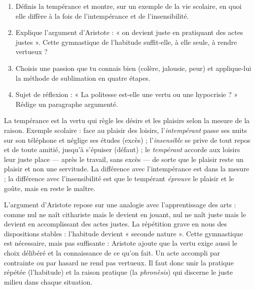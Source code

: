 \documentclass[11pt]{article}
\begin{document}
\begin{exercice}
\begin{enumerate}
\item Définis la tempérance et montre, sur un exemple de la vie scolaire, en quoi elle diffère à la fois de l'intempérance et de l'insensibilité.
\item Explique l'argument d'Aristote : « on devient juste en pratiquant des actes justes ». Cette gymnastique de l'habitude suffit-elle, à elle seule, à rendre vertueux ?
\item Choisis une passion que tu connais bien (colère, jalousie, peur) et applique-lui la méthode de sublimation en quatre étapes.
\item Sujet de réflexion : « La politesse est-elle une vertu ou une hypocrisie ? » Rédige un paragraphe argumenté.
\end{enumerate}
\end{exercice}

\begin{corrige}[Exercice 1]
La tempérance est la vertu qui règle les désirs et les plaisirs selon la mesure de la raison. Exemple scolaire : face au plaisir des loisirs, l'\emph{intempérant} passe ses nuits sur son téléphone et néglige ses études (excès) ; l'\emph{insensible} se prive de tout repos et de toute amitié, jusqu'à s'épuiser (défaut) ; le \emph{tempérant} accorde aux loisirs leur juste place — après le travail, sans excès — de sorte que le plaisir reste un plaisir et non une servitude. La différence avec l'intempérance est dans la mesure ; la différence avec l'insensibilité est que le tempérant \emph{éprouve} le plaisir et le goûte, mais en reste le maître.
\end{corrige}

\begin{corrige}[Exercice 2]
L'argument d'Aristote repose sur une analogie avec l'apprentissage des arts : comme nul ne naît cithariste mais le devient en jouant, nul ne naît juste mais le devient en accomplissant des actes justes. La répétition grave en nous des dispositions stables : l'habitude devient « seconde nature ». Cette gymnastique est nécessaire, mais pas suffisante : Aristote ajoute que la vertu exige aussi le choix délibéré et la connaissance de ce qu'on fait. Un acte accompli par contrainte ou par hasard ne rend pas vertueux. Il faut donc unir la pratique répétée (l'habitude) et la raison pratique (la \emph{phronèsis}) qui discerne le juste milieu dans chaque situation.
\end{corrige}
\end{document}
